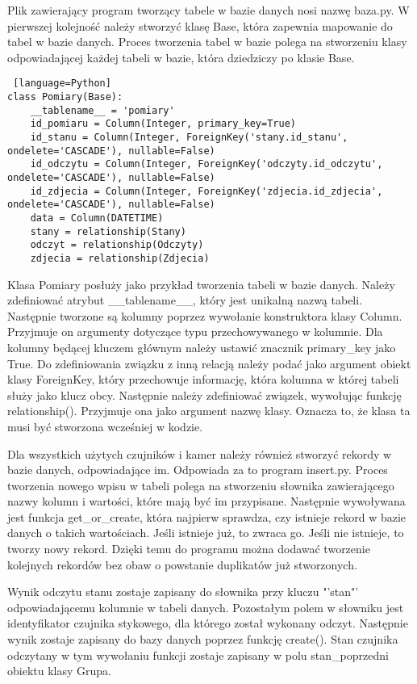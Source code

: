 \documentclass[a4paper,12pt,twoside]{article}
\begin{document}
Plik zawierający program tworzący tabele w bazie danych nosi nazwę baza.py. W pierwszej kolejność należy stworzyć klasę Base, która zapewnia mapowanie do tabel w bazie danych. Proces tworzenia tabel w bazie polega na stworzeniu klasy odpowiadającej każdej tabeli w bazie, która dziedziczy po klasie Base.
\begin{lstlisting} [language=Python]
class Pomiary(Base):
    __tablename__ = 'pomiary'
    id_pomiaru = Column(Integer, primary_key=True)
    id_stanu = Column(Integer, ForeignKey('stany.id_stanu', ondelete='CASCADE'), nullable=False)
    id_odczytu = Column(Integer, ForeignKey('odczyty.id_odczytu', ondelete='CASCADE'), nullable=False)
    id_zdjecia = Column(Integer, ForeignKey('zdjecia.id_zdjecia', ondelete='CASCADE'), nullable=False)
    data = Column(DATETIME)
    stany = relationship(Stany)
    odczyt = relationship(Odczyty)
    zdjecia = relationship(Zdjecia)
\end{lstlisting}
Klasa Pomiary posłuży jako przykład tworzenia tabeli w bazie danych. Należy zdefiniować atrybut {\_\_}tablename{\_\_}, który jest unikalną nazwą tabeli. Następnie tworzone są kolumny poprzez wywołanie konstruktora klasy Column. Przyjmuje on argumenty dotyczące typu przechowywanego w kolumnie. Dla kolumny będącej kluczem głównym należy ustawić znacznik primary{\_}key jako True. Do zdefiniowania związku z inną relacją należy podać jako argument obiekt klasy ForeignKey, który przechowuje informację, która kolumna w której tabeli służy jako klucz obcy. Następnie należy zdefiniować związek, wywołując funkcję relationship(). Przyjmuje ona jako argument nazwę klasy. Oznacza to, że klasa ta musi być stworzona wcześniej w kodzie.

Dla wszystkich użytych czujników i kamer należy również stworzyć rekordy w bazie danych, odpowiadające im. Odpowiada za to program insert.py. Proces tworzenia nowego wpisu w tabeli polega na stworzeniu słownika zawierającego nazwy kolumn i wartości, które mają być im przypisane. Następnie wywoływana jest funkcja get{\_}or{\_}create, która najpierw sprawdza, czy istnieje rekord w bazie danych o takich wartościach. Jeśli istnieje już, to zwraca go. Jeśli nie istnieje, to tworzy nowy rekord. Dzięki temu do programu można dodawać tworzenie kolejnych rekordów bez obaw o powstanie duplikatów już stworzonych.

Wynik odczytu stanu zostaje zapisany do słownika przy kluczu "'stan"' odpowiadającemu kolumnie w tabeli danych. Pozostałym polem w słowniku jest identyfikator czujnika stykowego, dla którego został wykonany odczyt. Następnie wynik zostaje zapisany do bazy danych poprzez funkcję create(). Stan czujnika odczytany w tym wywołaniu funkcji zostaje zapisany w polu stan{\_}poprzedni obiektu klasy Grupa. 
\end{document}
